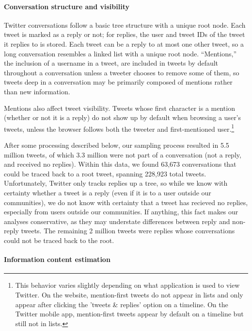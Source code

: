 \documentclass[11pt,letterpaper]{article}
\begin{document}
\paragraph{Conversation structure and visibility}\label{sect:conversation}

Twitter conversations follow a basic tree structure with a unique root node. Each tweet is marked as a reply or not; for replies, the user and tweet IDs of the tweet it replies to is stored. Each tweet can be a reply to at most one other tweet, so a long conversation resembles a linked list with a unique root node. ``Mentions,'' the inclusion of a username in a tweet, are included in tweets by default throughout a conversation unless a tweeter chooses to remove some of them, so tweets deep in a conversation may be primarily composed of mentions rather than new information.  

Mentions also affect tweet visibility.  Tweets whose first character is a mention (whether or not it is a reply) do not show up by default when browsing a user's tweets, unless the browser follows both the tweeter and first-mentioned user.\footnote{This behavior varies slightly depending on what application is used to view Twitter.  On the website, mention-first tweets do not appear in lists and only appear after clicking the 'tweets \& replies' option on a timeline. On the Twitter mobile app, mention-first tweets appear by default on a timeline but still not in lists.}

After some processing described below, our sampling process resulted in 5.5 million tweets, of which 3.3 million were not part of a conversation (not a reply, and received no replies).  Within this data, we found 63,673 conversations that could be traced back to a root tweet, spanning 228,923 total tweets. Unfortunately, Twitter only tracks replies up a tree, so while we know with certainty whether a tweet is a reply (even if it is to a user outside our communities), we do not know with certainty that a tweet has recieved no replies, especially from users outside our communities. If anything, this fact makes our analyses conservative, as they may understate differences between reply and non-reply tweets. The remaining 2 million tweets were replies whose conversations could not be traced back to the root.

\paragraph{Information content estimation}
\end{document}
